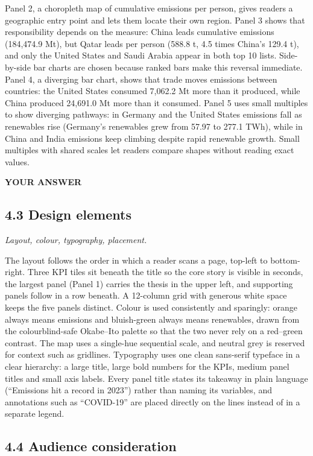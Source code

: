 \documentclass[
]{article}
\begin{document}
Panel 2, a choropleth map of cumulative emissions per person, gives
readers a geographic entry point and lets them locate their own region.
Panel 3 shows that responsibility depends on the measure: China leads
cumulative emissions (184,474.9 Mt), but Qatar leads per person (588.8
t, 4.5 times China's 129.4 t), and only the United States and Saudi
Arabia appear in both top 10 lists. Side-by-side bar charts are chosen
because ranked bars make this reversal immediate. Panel 4, a diverging
bar chart, shows that trade moves emissions between countries: the
United States consumed 7,062.2 Mt more than it produced, while China
produced 24,691.0 Mt more than it consumed. Panel 5 uses small multiples
to show diverging pathways: in Germany and the United States emissions
fall as renewables rise (Germany's renewables grew from 57.97 to 277.1
TWh), while in China and India emissions keep climbing despite rapid
renewable growth. Small multiples with shared scales let readers compare
shapes without reading exact values.

\textbf{YOUR ANSWER}

\subsection{4.3 Design elements}\label{design-elements}

\emph{Layout, colour, typography, placement.}

The layout follows the order in which a reader scans a page, top-left to
bottom-right. Three KPI tiles sit beneath the title so the core story is
visible in seconds, the largest panel (Panel 1) carries the thesis in
the upper left, and supporting panels follow in a row beneath. A
12-column grid with generous white space keeps the five panels distinct.
Colour is used consistently and sparingly: orange always means emissions
and bluish-green always means renewables, drawn from the
colourblind-safe Okabe--Ito palette so that the two never rely on a
red--green contrast. The map uses a single-hue sequential scale, and
neutral grey is reserved for context such as gridlines. Typography uses
one clean sans-serif typeface in a clear hierarchy: a large title, large
bold numbers for the KPIs, medium panel titles and small axis labels.
Every panel title states its takeaway in plain language (``Emissions hit
a record in 2023'') rather than naming its variables, and annotations
such as ``COVID-19'' are placed directly on the lines instead of in a
separate legend.

\subsection{4.4 Audience consideration}\label{audience-consideration}
\end{document}
